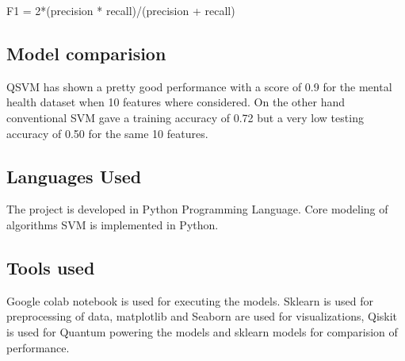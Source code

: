 \documentclass[10pt,journal,compsoc]{IEEEtran}
\begin{document}
F1 = 2*(precision * recall)/(precision + recall)

\subsection{Model comparision}
QSVM has shown a pretty good performance with a score of 0.9 for the mental health dataset when 10 features where considered. On the other hand conventional SVM gave a  training accuracy of 0.72 but a very low testing accuracy of 0.50 for the same 10 features.

\subsection{Languages Used}
The project is developed in Python Programming Language. Core modeling of algorithms SVM is implemented in Python. 

\subsection{Tools used}
Google colab notebook is used for executing the models. Sklearn is used for preprocessing of data, matplotlib and Seaborn are used for visualizations, Qiskit is used for Quantum powering the models and sklearn models for comparision of performance.

%
%

\end{document}
